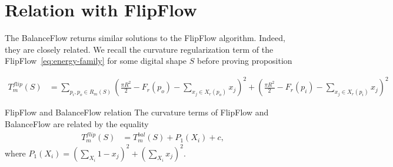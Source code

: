 \section{Relation with FlipFlow}
	The BalanceFlow returns similar solutions to the FlipFlow algorithm. Indeed, they are closely related. We recall the curvature regularization term of the FlipFlow~\cref{eq:energy-family} for some digital shape $S$ before proving proposition

\begin{align}
T_{m}^{flip}(S) &= \sum_{ p_i,p_o \in R_m(S)}{ ( \frac{\pi R^2}{2} - F_r(p_o) - \sum_{x_j \in X_r(p_o)}{x_j})^2 + (\frac{\pi R^2}{2} - F_r(p_i) - \sum_{x_j \in X_r(p_i)}{x_j})^2 }
\label{eq:curvature-term}
\end{align}

\begin{proposition}{FlipFlow and BalanceFlow relation}
The curvature terms of FlipFlow and BalanceFlow are related by the equality
\begin{align*}
T_{m}^{flip}(S) &= T_{m}^{bal}(S) + P_1(X_i) + c,
\end{align*}
where $P_1(X_i) = (\sum_{X_i}{ 1-x_j})^2 + (\sum_{X_i}{x_j})^2.$
\label{prop:flipflow-balanceflow-relation}
\end{proposition}

